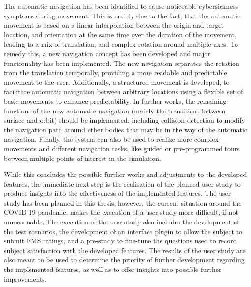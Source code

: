 The automatic navigation has been identified to cause noticeable cybersickness symptoms during movement.
This is mainly due to the fact, that the automatic movement is based on a linear interpolation between the origin and
target location, and orientation at the same time over the duration of the movement, leading to a mix of translation,
and complex rotation around multiple axes.
To remedy this, a new navigation concept has been developed and major functionality has been implemented.
The new navigation separates the rotation from the translation temporally, providing a more readable and predictable
movement to the user.
Additionally, a structured movement is developed, to facilitate automatic navigation between arbitrary locations
using a flexible set of basic movements to enhance predictability.
In further works, the remaining functions of the new automatic navigation (mainly the transitions between surface and
orbit) should be implemented, including collision detection to modify the navigation path around other bodies that may
be in the way of the automatic navigation.
Finally, the system can also be used to realize more complex movements and different navigation tasks, like guided or
pre-programmed tours between multiple points of interest in the simulation.

While this concludes the possible further works and adjustments to the developed features, the immediate next step is
the realisation of the planned user study to produce insights into the effectiveness of the implemented features.
The user study has been planned in this thesis, however, the current situation around the COVID-19 pandemic, makes the
execution of a user study more difficult, if not unreasonable.
The execution of the user study also includes the development of the test scenarios, the development of an interface
plugin to allow the subject to submit FMS ratings, and a pre-study to fine-tune the questions used to record subject
satisfaction with the developed features.
The results of the user study are also meant to be used to determine the priority of further development regarding
the implemented features, as well as to offer insights into possible further improvements.

